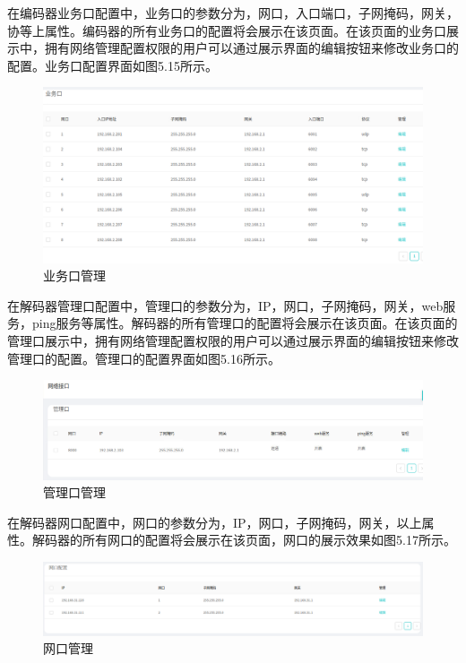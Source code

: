 在编码器业务口配置中，业务口的参数分为，网口，入口端口，子网掩码，网关，协等上属性。编码器的所有业务口的配置将会展示在该页面。在该页面的业务口展示中，拥有网络管理配置权限的用户可以通过展示界面的编辑按钮来修改业务口的配置。业务口配置界面如图5.15所示。

\begin{figure}[!htbp]
\centering
\includegraphics[scale=0.6]{figures/HW/N8.png}
\caption{业务口管理}
\end{figure}

在解码器管理口配置中，管理口的参数分为，IP，网口，子网掩码，网关，web服务，ping服务等属性。解码器的所有管理口的配置将会展示在该页面。在该页面的管理口展示中，拥有网络管理配置权限的用户可以通过展示界面的编辑按钮来修改管理口的配置。管理口的配置界面如图5.16所示。

\begin{figure}[!htbp]
\centering
\includegraphics[scale=0.6]{figures/HW/N9.png}
\caption{管理口管理}
\end{figure}

在解码器网口配置中，网口的参数分为，IP，网口，子网掩码，网关，以上属性。解码器的所有网口的配置将会展示在该页面，网口的展示效果如图5.17所示。

\begin{figure}[!htbp]
\centering
\includegraphics[scale=0.6]{figures/HW/N10.png}
\caption{网口管理}
\end{figure}

